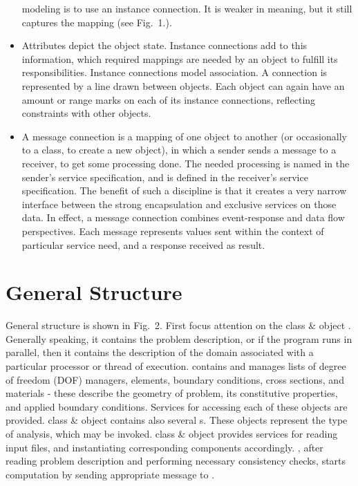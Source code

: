 \begin{htmlonly}
\begin{center}
\begin{itemize}
modeling is to use an instance connection. It is weaker in meaning, but
it still captures the mapping (see Fig.~1.). 
\item
Attributes depict the object state. Instance connections add to this
information, which required mappings are needed by an object to fulfill
its responsibilities. Instance connections model association. A
connection is represented by a line drawn between objects. Each object
can again have an amount or range marks on each of its instance
connections, reflecting constraints with other objects.
\item
A message connection is a mapping of one object to another (or
occasionally to a class, to create a new object), in which a sender
sends a message to a receiver, to get some processing done. The needed
processing is named in the sender's service specification, and is defined
in the receiver's service specification. The benefit of such a discipline
is that it creates a very narrow interface between the strong
encapsulation and exclusive services on those data. In effect, a
message connection combines event-response and data flow perspectives.
Each message represents values sent within the context of
particular service need, and a response received as result.
\end{itemize}


\section{General Structure}

General structure is shown in Fig.~2.
First focus attention on the class \& object . Generally
speaking, it contains the problem description, or if the program runs in
parallel, then it contains the description of the domain associated
with a particular processor or thread of execution.  
contains and manages lists of degree of freedom (DOF) managers, elements, boundary
conditions, cross sections, and materials - these describe the geometry
of problem, its constitutive properties, and applied boundary
conditions. Services for accessing each of these objects are
provided.  class \& object contains also several s. These objects represent the type of analysis, which may be
invoked. 
 class \& object provides services for reading input
files, and instantiating corresponding components accordingly. ,
after reading problem description and performing necessary consistency
checks, starts computation by sending appropriate message to
.




\end{center}
\end{htmlonly}
